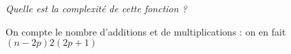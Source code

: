 \begin{Exercise}
\it Quelle est la complexité de cette fonction ?
\end{Exercise}
\begin{Answer}

On compte le nombre d'additions et de multiplications : on en fait 
$(n-2p)2(2p+1)$
\end{Answer}






% 


